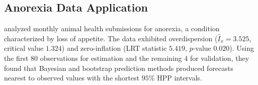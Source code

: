 \documentclass[twoside]{article}
\begin{document}
\subsection{Anorexia Data Application}
\cite{Nasirzadeh:2024} analyzed monthly animal health submissions for anorexia, a condition characterized by loss of appetite. The data exhibited overdispersion ($\hat{I}_x=3.525$, critical value $1.324$) and zero-inflation (LRT statistic $5.419$, $p$-value $0.020$). Using the first 80 observations for estimation and the remaining 4 for validation, they found that Bayesian and bootstrap prediction methods produced forecasts nearest to observed values with the shortest $95\%$ HPP intervals.
\begin{table}[h]
\begin{center}
\caption{Prediction analysis of anorexia count time series data.}\label{tabxy}
\end{center}
\end{table}
\end{document}
